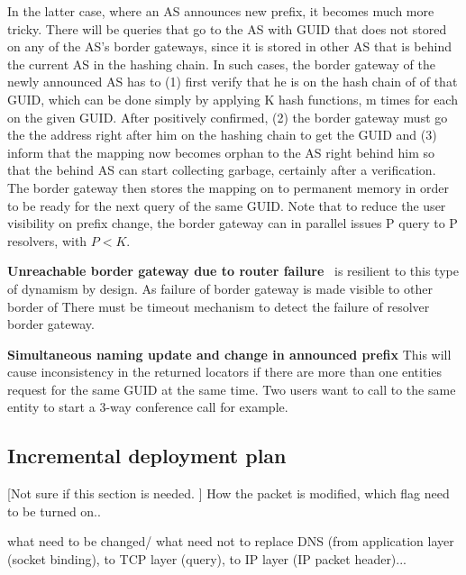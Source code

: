         In the latter case, where an AS announces new prefix, it becomes much more tricky. There will be queries that go to the AS with GUID that does not stored on any of the AS's border gateways, since it is stored in other AS that is behind the current AS in the hashing chain. In such cases, the border gateway of the newly announced AS has to (1) first verify that he is on the hash chain of of that GUID, which can be done simply by applying K hash functions, m times for each on the given GUID. After positively confirmed, (2) the border gateway must go the the address right after him on the hashing chain to get the GUID and (3) inform that the mapping now becomes orphan to the AS right behind him so that the behind AS can start collecting garbage, certainly after a verification. The border gateway then stores the mapping on to permanent memory in order to be ready for the next query of the same GUID. Note that to reduce the user visibility on prefix change, the border gateway can in parallel issues P query to P resolvers, with $P<K$.

        \textbf{Unreachable border gateway due to router failure} \arcName~is resilient to this type of dynamism by design. As failure of border gateway is made visible to other border
        of There must be timeout mechanism to detect the failure of resolver border gateway.

        \textbf{Simultaneous naming update and change in announced prefix} This will cause inconsistency in the returned locators if there are more than one entities request for the same GUID at the same time. Two users want to call to the same entity to start a 3-way conference call for example.

    \subsection{Incremental deployment plan}
        [Not sure if this section is needed. ]
        How the packet is modified, which flag need to be turned on..

        what need to be changed/ what need not to replace DNS (from application layer (socket binding), to TCP layer (query), to IP layer (IP packet header)...

